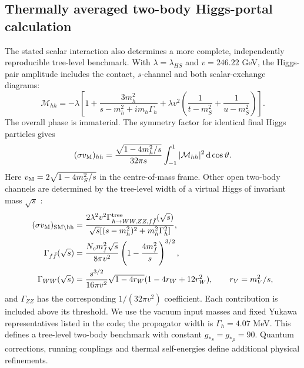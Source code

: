 \subsection{Thermally averaged two-body Higgs-portal calculation}\label{sec:portal-complete}
The stated scalar interaction also determines a more complete, independently reproducible tree-level benchmark. With $\lambda=\lambda_{HS}$ and $v=246.22$ GeV, the Higgs-pair amplitude includes the contact, $s$-channel and both scalar-exchange diagrams:
\begin{equation}\label{eq:hh-amplitude}
\mathcal M_{hh}=-\lambda\left[1+\frac{3m_h^2}{s-m_h^2+im_h\Gamma_h}
+\lambda v^2\left(\frac1{t-m_S^2}+\frac1{u-m_S^2}\right)\right].
\end{equation}
The overall phase is immaterial. The symmetry factor for identical final Higgs particles gives
\begin{equation}
(\sigma v_{\rm M})_{hh}=\frac{\sqrt{1-4m_h^2/s}}{32\pi s}
\int_{-1}^{1}|\mathcal M_{hh}|^2\,\mathrm{d}\cos\vartheta.
\end{equation}
Here $v_{\rm M}=2\sqrt{1-4m_S^2/s}$ in the centre-of-mass frame. Other open two-body channels are determined by the tree-level width of a virtual Higgs of invariant mass $\sqrt s$ \cite{Cline13}:
\begin{align}
(\sigma v_{\rm M})_{\rm SM\setminus hh}
&=\frac{2\lambda^2v^2\Gamma^{\rm tree}_{h\to WW,ZZ,f\bar f}(\sqrt s)}
{\sqrt s[(s-m_h^2)^2+m_h^2\Gamma_h^2]},\\
\Gamma_{f\bar f}(\sqrt s)&=\frac{N_c m_f^2\sqrt s}{8\pi v^2}
\left(1-\frac{4m_f^2}{s}\right)^{3/2},\\
\Gamma_{WW}(\sqrt s)&=\frac{s^{3/2}}{16\pi v^2}\sqrt{1-4r_W}
(1-4r_W+12r_W^2),\qquad r_V=m_V^2/s,
\end{align}
and $\Gamma_{ZZ}$ has the corresponding $1/(32\pi v^2)$ coefficient. Each contribution is included above its threshold. We use the vacuum input masses and fixed Yukawa representatives listed in the code; the propagator width is $\Gamma_h=4.07$ MeV. This defines a tree-level two-body benchmark with constant $g_{*s}=g_{*\rho}=90$. Quantum corrections, running couplings and thermal self-energies define additional physical refinements.

